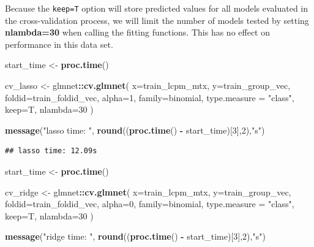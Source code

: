 \documentclass[
]{book}
\newenvironment{Shaded}{\begin{snugshade}}{\end{snugshade}}
\newcommand{\DataTypeTok}[1]{\textcolor[rgb]{0.13,0.29,0.53}{#1}}
\newcommand{\DecValTok}[1]{\textcolor[rgb]{0.00,0.00,0.81}{#1}}
\newcommand{\KeywordTok}[1]{\textcolor[rgb]{0.13,0.29,0.53}{\textbf{#1}}}
\newcommand{\NormalTok}[1]{#1}
\newcommand{\OperatorTok}[1]{\textcolor[rgb]{0.81,0.36,0.00}{\textbf{#1}}}
\newcommand{\StringTok}[1]{\textcolor[rgb]{0.31,0.60,0.02}{#1}}
\begin{document}
Because the \texttt{keep=T} option will store predicted values for
all models evaluated in the cross-validation process, we will
limit the number of models tested by setting \textbf{nlambda=30}
when calling the fitting functions. This has no effect on
performance in this data set.

\begin{Shaded}
\begin{Highlighting}[]
\NormalTok{start\_time <{-}}\StringTok{  }\KeywordTok{proc.time}\NormalTok{()}

\NormalTok{cv\_lasso <{-}}\StringTok{ }\NormalTok{glmnet}\OperatorTok{::}\KeywordTok{cv.glmnet}\NormalTok{(}
 \DataTypeTok{x=}\NormalTok{train\_lcpm\_mtx,}
 \DataTypeTok{y=}\NormalTok{train\_group\_vec,}
 \DataTypeTok{foldid=}\NormalTok{train\_foldid\_vec,}
 \DataTypeTok{alpha=}\DecValTok{1}\NormalTok{,}
 \DataTypeTok{family=}\StringTok{\textquotesingle{}binomial\textquotesingle{}}\NormalTok{, }
 \DataTypeTok{type.measure =} \StringTok{"class"}\NormalTok{,}
 \DataTypeTok{keep=}\NormalTok{T,}
 \DataTypeTok{nlambda=}\DecValTok{30}
\NormalTok{)}

\KeywordTok{message}\NormalTok{(}\StringTok{"lasso time: "}\NormalTok{, }\KeywordTok{round}\NormalTok{((}\KeywordTok{proc.time}\NormalTok{() }\OperatorTok{{-}}\StringTok{ }\NormalTok{start\_time)[}\DecValTok{3}\NormalTok{],}\DecValTok{2}\NormalTok{),}\StringTok{"s"}\NormalTok{)}
\end{Highlighting}
\end{Shaded}

\begin{verbatim}
## lasso time: 12.09s
\end{verbatim}

\begin{Shaded}
\begin{Highlighting}[]
\NormalTok{start\_time <{-}}\StringTok{  }\KeywordTok{proc.time}\NormalTok{()}

\NormalTok{cv\_ridge <{-}}\StringTok{ }\NormalTok{glmnet}\OperatorTok{::}\KeywordTok{cv.glmnet}\NormalTok{(}
 \DataTypeTok{x=}\NormalTok{train\_lcpm\_mtx,}
 \DataTypeTok{y=}\NormalTok{train\_group\_vec,}
 \DataTypeTok{foldid=}\NormalTok{train\_foldid\_vec,}
 \DataTypeTok{alpha=}\DecValTok{0}\NormalTok{,}
 \DataTypeTok{family=}\StringTok{\textquotesingle{}binomial\textquotesingle{}}\NormalTok{, }
 \DataTypeTok{type.measure =} \StringTok{"class"}\NormalTok{,}
 \DataTypeTok{keep=}\NormalTok{T,}
 \DataTypeTok{nlambda=}\DecValTok{30}
\NormalTok{)}

\KeywordTok{message}\NormalTok{(}\StringTok{"ridge time: "}\NormalTok{, }\KeywordTok{round}\NormalTok{((}\KeywordTok{proc.time}\NormalTok{() }\OperatorTok{{-}}\StringTok{ }\NormalTok{start\_time)[}\DecValTok{3}\NormalTok{],}\DecValTok{2}\NormalTok{),}\StringTok{"s"}\NormalTok{)}
\end{Highlighting}
\end{Shaded}
\end{document}
